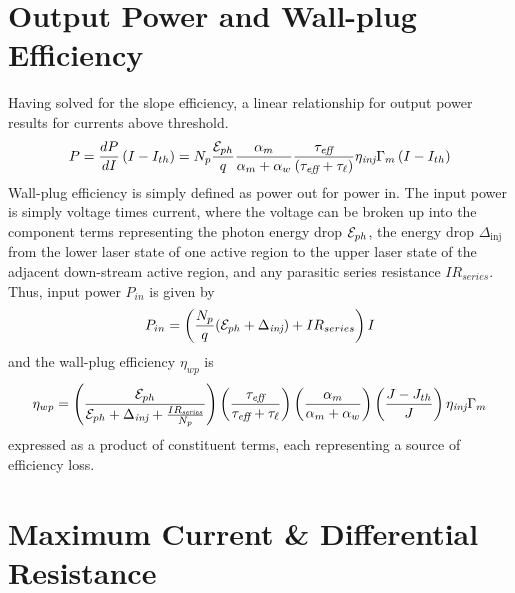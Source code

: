 \documentclass[12pt]{report}
\begin{document}
\section{Output Power and Wall-plug Efficiency}
Having solved for the slope efficiency, a linear relationship for output power results for currents above threshold.
\begin{equation}
P=\frac{d P}{dI} \left( I - I_{th} \right) = N_p \frac{\EE_{ph}}{q} \frac{\alpha_m}{\alpha_m+\alpha_w}   \frac{\tau_\textit{eff}}{\left(\tau_\textit{eff}+\tau_{\ell}\right)} \eta_\textit{inj} \Gamma_{m}  \left( I - I_{th} \right)
\end{equation}
Wall-plug efficiency is simply defined as power out for power in.  The input power is simply voltage times current, where the voltage can be broken up into the component terms representing the photon energy drop $\EE_{ph}$, the energy drop $\Delta_\text{inj}$ from the lower laser state of one active region to the upper laser state of the adjacent down-stream active region, and any parasitic series resistance $I R_{series}$.  Thus, input power $P_{in}$ is given by
\begin{equation}
P_{in} = \left( \frac{N_p}{q} (\EE_{ph}+\Delta_\textit{inj})+ I R_{series} \right) I
\end{equation}
and the wall-plug efficiency $\eta_{wp}$ is
\begin{equation}
\eta_{wp}=
\Biggl( \frac{\EE_{ph}}{\EE_{ph}+\Delta_\textit{inj}+\frac{I R_\textit{series}}{N_p}} \Biggr)
\left(\frac{\tau_\textit{eff}}{\tau_\textit{eff}+\tau_\ell} \right)
\left(\frac{\alpha_m}{\alpha_m + \alpha_w} \right)
\left(\frac{J-J_{th}}{J}  \right)
\eta_\textit{inj}
\Gamma_m
\end{equation}
expressed as a product of constituent terms, each representing a source of efficiency loss.


\section{Maximum Current \& Differential Resistance}
\end{document}
